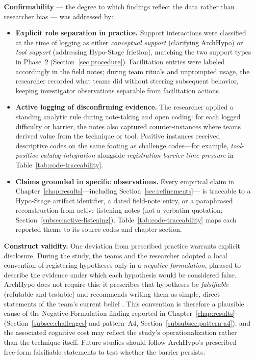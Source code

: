 \textbf{Confirmability} --- the degree to which findings reflect the data rather
than researcher bias --- was addressed by: 

\begin{itemize}
  \item[(i)] \textbf{Explicit role separation in practice.} Support interactions
    were classified at the time of logging as either \emph{conceptual support}
    (clarifying ArchHypo) or \emph{tool support} (addressing Hypo-Stage friction),
    matching the two support types in Phase~2
    (Section~\ref{sec:procedure}). Facilitation entries were labeled accordingly in
    the field notes; during team rituals and unprompted usage, the researcher
    recorded what teams did without steering subsequent behavior, keeping
    investigator observations separable from facilitation actions.
  \item[(ii)] \textbf{Active logging of disconfirming evidence.} The researcher
    applied a standing analytic rule during note-taking and open coding: for each
    logged difficulty or barrier, the notes also captured counter-instances where
    teams derived value from the technique or tool. Positive instances received
    descriptive codes on the same footing as challenge codes---for example,
    \textit{tool-positive-catalog-integration} alongside
    \textit{registration-barrier-time-pressure} in
    Table~\ref{tab:code-traceability}.
  \item[(iii)] \textbf{Claims grounded in specific observations.} Every empirical
    claim in Chapter~\ref{chap:results}---including Section~\ref{sec:refinements}---
    is traceable to a Hypo-Stage artifact identifier, a dated field-note entry, or a
    paraphrased reconstruction from active-listening notes (not a verbatim quotation;
    Section~\ref{subsec:active-listening}). Table~\ref{tab:code-traceability} maps
    each reported theme to its source codes and chapter section.
\end{itemize}

\textbf{Construct validity.} One deviation from prescribed practice warrants
explicit disclosure. During the study, the teams and the researcher adopted a local
convention of registering hypotheses only in a \emph{negative formulation}, phrased
to describe the evidence under which each hypothesis would be considered false.
ArchHypo does not require this: it prescribes that hypotheses be \emph{falsifiable}
(refutable and testable) and recommends writing them as simple, direct statements of
the team's current belief \citep{silva2024tse}. This convention is therefore a
plausible cause of the Negative-Formulation finding reported in
Chapter~\ref{chap:results} (Section~\ref{subsec:challenges} and pattern~A4,
Section~\ref{subsubsec:pattern-a4}), and the associated cognitive cost may reflect
the study's operationalization rather than the technique itself. Future studies
should follow ArchHypo's prescribed free-form falsifiable statements to
test whether the barrier persists.

